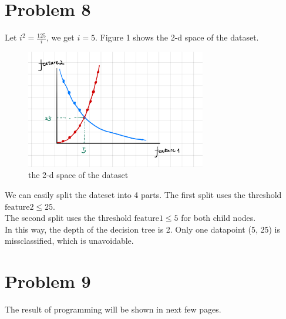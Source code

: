 \documentclass[12pt]{scrartcl}
\begin{document}
  \section*{Problem 8}
  Let \(i^2 = \frac{125}{i}\), we get \(i = 5\). Figure 1 shows the 2-d space of the
  dataset. 
  \begin{figure}[!htb] %
    \centering %
    \includegraphics[width=0.7\textwidth]{Problem8.png} %
    \caption{the 2-d space of the dataset} %
    \label{Fig.main2} %
  \end{figure}
  
  We can easily split the dateset into 4 parts.
  The first split uses the threshold \(\text{feature2} \leqslant 25\). \\
  The second split uses the threshold \(\text{feature1} \leqslant 5\) for both child nodes. \\
  In this way, the depth of the decision tree is 2. Only one datapoint (5, 25) is missclassified,
  which is unavoidable.
  
    \section*{Problem 9}
 
 The result of programming will be shown in next few pages.
  
\end{document}

